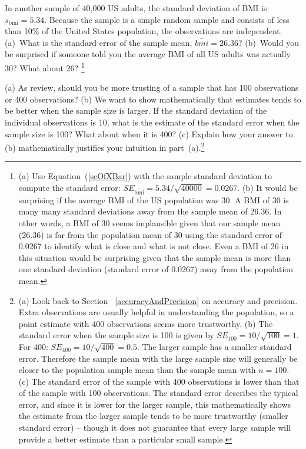 \begin{exercise}
In another sample of 40,000 US adults, the standard deviation of BMI is $s_\mathrm{bmi} = 5.34$. Because the sample is a simple random sample and consists of less than 10\% of the United States population, the observations are independent. (a)~What is the standard error of the sample mean, $\bar{bmi}=26.36$? (b)~Would you be surprised if someone told you the average BMI of all US adults was actually 30? What about 26? \footnote{(a) Use Equation~(\ref{seOfXBar}) with the sample standard deviation to compute the standard error: $SE_{\bar{\mathrm{bmi}}} = 5.34/\sqrt{40000} =  0.0267$. (b) It would be surprising if the average BMI of the US population was 30. A BMI of 30 is many many standard deviations away from the sample mean of 26.36. In other words, a BMI of 30 seems implausible given that our sample mean (26.36) is far from the population mean of 30 using the standard error of 0.0267 to identify what is close and what is not close. Even a BMI of 26 in this situation would be surprising given that the sample mean is more than one standard deviation (standard error of 0.0267) away from the population mean.}
\end{exercise}


\begin{exercise}
(a) As review, should you be more trusting of a sample that has 100 observations or 400 observations? (b) We want to show mathematically that estimates tends to be better when the sample size is larger. If the standard deviation of the individual observations is 10, what is the estimate of the standard error when the sample size is 100? What about when it is 400? (c) Explain how your answer to (b) mathematically justifies your intuition in part~(a).\footnote{(a) Look back to Section ~\ref{accuracyAndPrecision} on accuracy and precision. Extra observations are usually helpful in understanding the population, so a point estimate with 400 observations seems more trustworthy. (b) The standard error when the sample size is 100 is given by $SE_{100} = 10/\sqrt{100} = 1$. For 400: $SE_{400} = 10/\sqrt{400} = 0.5$. The larger sample has a smaller standard error. Therefore the sample mean with the large sample size will generally be closer to the population sample mean than the sample mean with $n=100$. (c) The standard error of the sample with 400 observations is lower than that of the sample with 100 observations. The standard error describes the typical error, and since it is lower for the larger sample, this mathematically shows the estimate from the larger sample tends to be more trustworthy (smaller standard error) -- though it does not guarantee that every large sample will provide a better estimate than a particular small sample.}
\end{exercise}

